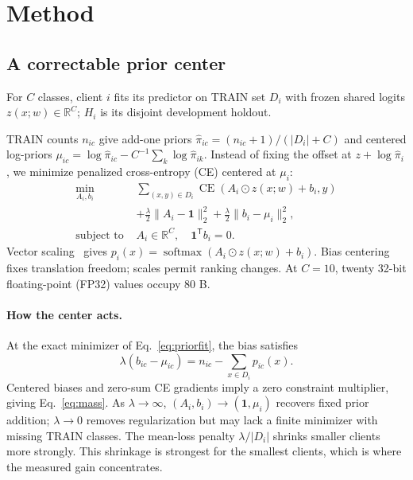 \section{Method}

\subsection{A correctable prior center}
For $C$ classes, client $i$ fits its predictor on TRAIN set $D_i$ with frozen shared logits $z(x;w)\in\mathbb{R}^C$; $H_i$ is its disjoint development holdout.

TRAIN counts $n_{ic}$ give add-one priors $\widehat\pi_{ic}=(n_{ic}+1)/(|D_i|+C)$ and centered log-priors $\mu_{ic}=\log\widehat\pi_{ic}-C^{-1}\sum_k\log\widehat\pi_{ik}$.
Instead of fixing the offset at $z+\log\widehat\pi_i$, we minimize penalized cross-entropy (CE) centered at $\mu_i$:
\begin{equation}\label{eq:priorfit}
\begin{aligned}
\min_{A_i,b_i}\;&\sum_{(x,y)\in D_i}\operatorname{CE}(A_i\odot z(x;w)+b_i,y)\\
&+\frac{\lambda}{2}\|A_i-\mathbf{1}\|_2^2
 +\frac{\lambda}{2}\|b_i-\mu_i\|_2^2,\\
\text{subject to }&A_i\in\mathbb{R}^C,\quad\mathbf{1}^{\mathsf T}b_i=0.
\end{aligned}
\end{equation}
Vector scaling~\cite{guo2017calibration} gives $p_i(x)=\operatorname{softmax}(A_i\odot z(x;w)+b_i)$. Bias centering fixes translation freedom; scales permit ranking changes. At $C=10$, twenty 32-bit floating-point (FP32) values occupy 80 B.

\paragraph{How the center acts.}
At the exact minimizer of Eq.~\ref{eq:priorfit}, the bias satisfies
\begin{equation}\label{eq:mass}
\lambda(b_{ic}-\mu_{ic})
=n_{ic}-\sum_{x\in D_i}p_{ic}(x).
\end{equation}
Centered biases and zero-sum CE gradients imply a zero constraint multiplier, giving Eq.~\ref{eq:mass}. As $\lambda\to\infty$, $(A_i,b_i)\to(\mathbf{1},\mu_i)$ recovers fixed prior addition; $\lambda\to0$ removes regularization but may lack a finite minimizer with missing TRAIN classes. The mean-loss penalty $\lambda/|D_i|$ shrinks smaller clients more strongly. This shrinkage is strongest for the smallest clients, which is where the measured gain concentrates.

